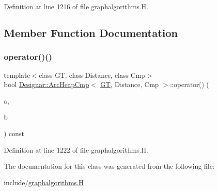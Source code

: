 Definition at line 1216 of file graphalgorithms.\+H.



\subsection{Member Function Documentation}
\mbox{\label{class_designar_1_1_arc_heap_cmp_a9d86fd876bad098a0a6844e9b302f141}} 
\subsubsection{\texorpdfstring{operator()()}{operator()()}}
{\footnotesize\ttfamily template$<$class GT, class Distance, class Cmp$>$ \\
bool \hyperlink{class_designar_1_1_arc_heap_cmp}{Designar\+::\+Arc\+Heap\+Cmp}$<$ \hyperlink{demo-buildgraph_8_c_a3001c40d2c31ca87ed96cd7d1334a55e}{GT}, Distance, Cmp $>$\+::operator() (\begin{DoxyParamCaption}\item[{typename G\+T\+::\+Arc $\ast$}]{a,  }\item[{typename G\+T\+::\+Arc $\ast$}]{b }\end{DoxyParamCaption}) const\hspace{0.3cm}{\ttfamily [inline]}}



Definition at line 1222 of file graphalgorithms.\+H.



The documentation for this class was generated from the following file\+:\begin{DoxyCompactItemize}
\item 
include/\hyperlink{graphalgorithms_8_h}{graphalgorithms.\+H}\end{DoxyCompactItemize}
